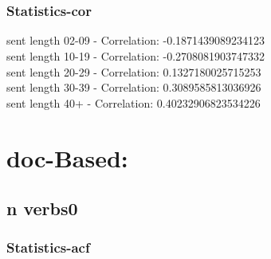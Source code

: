 \documentclass{article}%
\begin{document}
\begin{figure}[ht]%
\centering%
\setlength{\abovecaptionskip}{-35pt}%
%
%
\\%
%
%
\\%
%
\end{figure}

%
\newpage%
\subsubsection{Statistics{-}cor}%
\label{ssubsec:Statistics{-}cor}%
\noindent%
sent length 02-09 - Correlation: -0.1871439089234123\\%
sent length 10-19 - Correlation: -0.2708081903747332\\%
sent length 20-29 - Correlation: 0.1327180025715253\\%
sent length 30-39 - Correlation: 0.3089585813036926\\%
sent length 40+ - Correlation: 0.40232906823534226\\

%
\newpage

%
\section{doc{-}Based:}%
\label{sec:doc{-}Based}%
\subsection{n verbs0}%
\label{subsec:nverbs0}%
\subsubsection{Statistics{-}acf}%
\label{ssubsec:Statistics{-}acf}%
\end{document}
